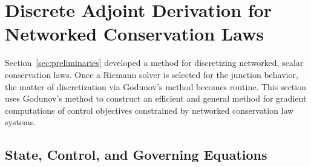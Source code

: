 

\section{Discrete Adjoint Derivation for Networked Conservation Laws}
\label{sec:discrete-adjoint-derivation}

Section~\ref{sec:preliminaries} developed a method for discretizing networked, scalar conservation laws. Once a Riemann solver is selected for the junction behavior, the matter of discretization via Godunov's method becomes routine. This section uses Godunov's method to construct an efficient and general method for gradient computations of control objectives constrained by networked conservation law systems.

\subsection{State, Control, and Governing Equations\label{sec:State,-control,-and}}

